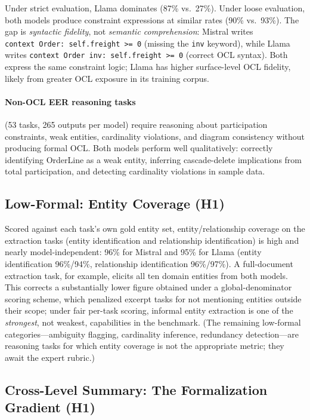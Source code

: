 \documentclass[runningheads]{llncs}
\begin{document}
Under strict evaluation, Llama dominates (87\% vs.\ 27\%). Under loose evaluation, both models produce constraint expressions at similar rates (90\% vs.\ 93\%). The gap is \emph{syntactic fidelity}, not \emph{semantic comprehension}: Mistral writes \texttt{context~Order:~self.freight~>=~0} (missing the \texttt{inv} keyword), while Llama writes \texttt{context~Order~inv:~self.freight~>=~0} (correct OCL syntax). Both express the same constraint logic; Llama has higher surface-level OCL fidelity, likely from greater OCL exposure in its training corpus.

\paragraph{Non-OCL EER reasoning tasks} (53 tasks, 265 outputs per model) require reasoning about participation constraints, weak entities, cardinality violations, and diagram consistency without producing formal OCL. Both models perform well qualitatively: correctly identifying OrderLine as a weak entity, inferring cascade-delete implications from total participation, and detecting cardinality violations in sample data.

\subsection{Low-Formal: Entity Coverage (H1)}

Scored against each task's own gold entity set, entity/relationship coverage on the extraction tasks (entity identification and relationship identification) is high and nearly model-independent: 96\% for Mistral and 95\% for Llama (entity identification 96\%/94\%, relationship identification 96\%/97\%). A full-document extraction task, for example, elicits all ten domain entities from both models. This corrects a substantially lower figure obtained under a global-denominator scoring scheme, which penalized excerpt tasks for not mentioning entities outside their scope; under fair per-task scoring, informal entity extraction is one of the \emph{strongest}, not weakest, capabilities in the benchmark. (The remaining low-formal categories---ambiguity flagging, cardinality inference, redundancy detection---are reasoning tasks for which entity coverage is not the appropriate metric; they await the expert rubric.)

\subsection{Cross-Level Summary: The Formalization Gradient (H1)}
\end{document}
